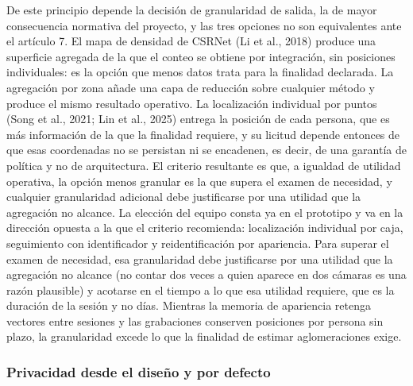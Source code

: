 De este principio depende la decisión de granularidad de salida, la de
mayor consecuencia normativa del proyecto, y las tres opciones no son
equivalentes ante el artículo 7. El mapa de densidad de CSRNet
(Li et al., 2018) produce una superficie agregada de la que el conteo
se obtiene por integración, sin posiciones individuales: es la opción
que menos datos trata para la finalidad declarada. La agregación por
zona añade una capa de reducción sobre cualquier método y produce el
mismo resultado operativo. La localización individual por puntos
(Song et al., 2021; Lin et al., 2025) entrega la posición de cada persona,
que es más información de la que la finalidad requiere, y su licitud
depende entonces de que esas coordenadas no se persistan ni se
encadenen, es decir, de una garantía de política y no de arquitectura.
El criterio resultante es que, a igualdad de utilidad operativa, la
opción menos granular es la que supera el examen de necesidad, y
cualquier granularidad adicional debe justificarse por una utilidad que
la agregación no alcance. La elección del equipo consta ya en el prototipo y
va en la dirección opuesta a la que el criterio recomienda: localización
individual por caja, seguimiento con identificador y reidentificación por
apariencia. Para superar el examen de necesidad, esa granularidad debe
justificarse por una utilidad que la agregación no alcance (no contar dos
veces a quien aparece en dos cámaras es una razón plausible) y acotarse en el
tiempo a lo que esa utilidad requiere, que es la duración de la sesión y no
días. Mientras la memoria de apariencia retenga vectores entre sesiones y las
grabaciones conserven posiciones por persona sin plazo, la granularidad
excede lo que la finalidad de estimar aglomeraciones exige.

\subsubsection{Privacidad desde el diseño y por defecto}

